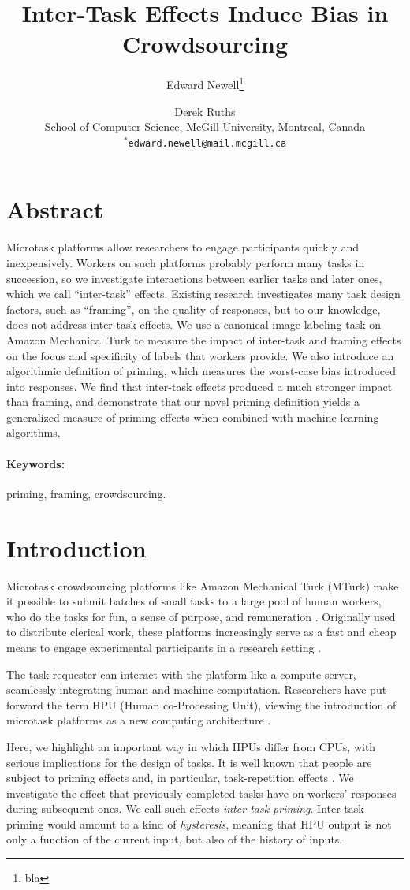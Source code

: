 \documentclass[letterpaper]{article}
\title{Inter-Task Effects Induce Bias in Crowdsourcing}
\author{Edward Newell\footnote{bla} \and Derek Ruths\\
School of Computer Science, McGill University, Montreal, Canada\\
$^*$\texttt{edward.newell@mail.mcgill.ca}\\
}
\begin{document}
\maketitle
\section*{Abstract}
Microtask platforms allow researchers to engage participants quickly and 
inexpensively.
Workers on such platforms probably perform many tasks in succession,
so we investigate interactions between earlier tasks and later ones, which we 
call ``inter-task'' effects.  
Existing research investigates many task design factors, such as 
``framing'', on the quality of responses, but to our knowledge, does not 
address inter-task effects.  
We use a canonical image-labeling task on Amazon Mechanical Turk 
to measure the impact of inter-task and framing effects on the focus and 
specificity of labels that workers provide.
We also introduce an algorithmic definition of priming, which measures the 
worst-case bias introduced into responses.
We find that inter-task effects produced a much stronger impact than framing, 
and demonstrate that our novel priming definition yields a generalized 
measure of priming effects when combined with machine learning algorithms.
\paragraph{Keywords:} priming, framing, crowdsourcing.
\section*{Introduction}
Microtask crowdsourcing platforms like Amazon Mechanical Turk (MTurk) make it 
possible to submit batches of small tasks to a large pool of human workers, 
who do the tasks for fun, a sense of purpose, and remuneration 
\cite{kazai2013analysis,Antin20122925}.  
Originally used to distribute clerical work, these platforms 
increasingly serve as a fast and cheap means to engage experimental 
participants in a research 
setting \cite{snow2008cheap}.  

The task requester can interact with the platform like a compute server, 
seamlessly 
integrating human and machine computation.  Researchers have put forward the 
term HPU (Human co-Processing Unit), viewing the introduction of 
microtask platforms as a new computing architecture
\cite{5543192}.  

Here, we highlight an important way in which HPUs differ from CPUs, with 
serious implications for the design of tasks.  It is well known that people 
are subject to priming effects 
\cite{BJOP1796,No2007,beller1971priming} and, in particular, task-repetition effects
\cite{Gass1999549,sohn2001task}.  
We investigate the effect that previously completed tasks have on workers'
responses during subsequent ones. We call such effects 
\textit{inter-task priming}.  Inter-task priming would amount to a kind of
\textit{hysteresis}, meaning that HPU output is not only a function of the 
current input, but also of the history of inputs.
\end{document}
